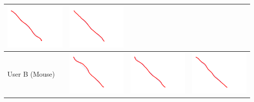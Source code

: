 \begin{tabular}{lccc}
\includegraphics[width=3cm]{fig_exp/line_Ayaka_test3_1_m.png} &
\includegraphics[width=3cm]{fig_exp/line_Ayaka_test3_2_m.png} \\
\midrule
 User B (Mouse)&
\includegraphics[width=3cm]{fig_exp/line_Angus_test3_0_m.png} &
\includegraphics[width=3cm]{fig_exp/line_Angus_test3_1_m.png} &
\includegraphics[width=3cm]{fig_exp/line_Angus_test3_2_m.png} \\
\bottomrule
\end{tabular}

